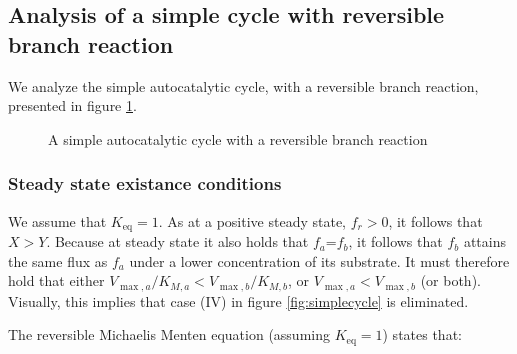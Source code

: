 \subsection{Analysis of a simple cycle with reversible branch reaction}
We analyze the simple autocatalytic cycle, with a reversible branch reaction, presented in figure \ref{fig:reversible}.
\begin{figure}[!htb]
  \centering
{}
     \caption{
         A simple autocatalytic cycle with a reversible branch reaction
     \label{fig:reversible}
 }

\end{figure}

\subsubsection{Steady state existance conditions}
We assume that $K_{\text{eq}}=1$.
As at a positive steady state, $f_r>0$, it follows that $X>Y$.
Because at steady state it also holds that $f_a$=$f_b$, it follows that $f_b$ attains the same flux as $f_a$ under a lower concentration of its substrate.
It must therefore hold that either $V_{\max,a}/K_{M,a}<V_{\max,b}/K_{M,b}$, or $V_{\max,a}<V_{\max,b}$ (or both).
Visually, this implies that case (IV) in figure \ref{fig:simplecycle} is eliminated.

The reversible Michaelis Menten equation (assuming $K_{\text{eq}}=1$)  states that:

